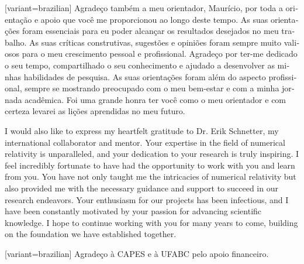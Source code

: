 \documentclass[12pt, twoside]{report}
\begin{document}
\begin{portuguese}[variant=brazilian]
  Agradeço também a meu orientador, Maurício, por toda a orientação e apoio que você me proporcionou ao longo deste tempo. As suas orientações foram essenciais para eu poder alcançar os resultados desejados no meu trabalho. As suas críticas construtivas, sugestões e opiniões foram sempre muito valiosos para o meu crescimento pessoal e profissional. Agradeço por ter-me dedicado o seu tempo, compartilhado o seu conhecimento e ajudado a desenvolver as minhas habilidades de pesquisa. As suas orientações foram além do aspecto profissional, sempre se mostrando preocupado com o meu bem-estar e com a minha jornada acadêmica. Foi uma grande honra ter você como o meu orientador e com certeza levarei as lições aprendidas no meu futuro.
\end{portuguese}

I would also like to express my heartfelt gratitude to Dr. Erik Schnetter, my international collaborator and mentor. Your expertise in the field of numerical relativity is unparalleled, and your dedication to your research is truly inspiring. I feel incredibly fortunate to have had the opportunity to work with you and learn from you. You have not only taught me the intricacies of numerical relativity but also provided me with the necessary guidance and support to succeed in our research endeavors. Your enthusiasm for our projects has been infectious, and I have been constantly motivated by your passion for advancing scientific knowledge. I hope to continue working with you for many years to come, building on the foundation we have established together.

\begin{portuguese}[variant=brazilian]
  Agradeço à CAPES e à UFABC pelo apoio financeiro.
\end{portuguese}

\begin{center}
  {\large{}\thispagestyle{empty}}{\large\par}
  \par\end{center}

\newpage

\begin{center}
  {\large{}\thispagestyle{empty}}{\large\par}
  \par\end{center}

\newpage

\end{document}
